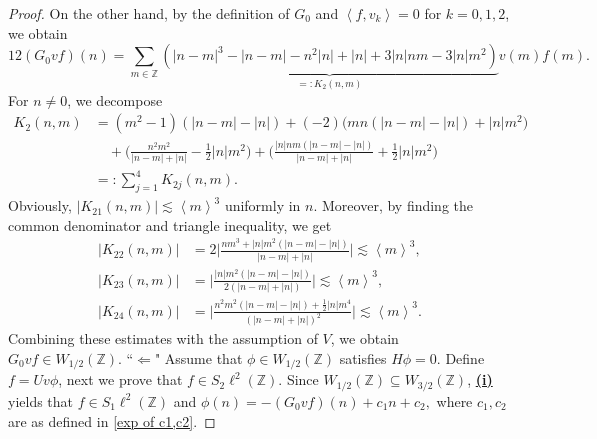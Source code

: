 \documentclass[reqno, 11pt]{amsart}
\newcommand\Z{\mathbb{Z}}
\numberwithin{equation}{section}
\begin{document}
\begin{proof}
On the other hand, by the definition of $G_0$ and $\left<f,v_k\right>=0$ for $k=0,1,2$, we obtain
\begin{equation*}
 12(G_0vf)(n)=\sum\limits_{m\in\Z}^{}\underbrace{\left(|n-m|^3-|n-m|-n^2|n|+|n|+3|n|nm-3|n|m^2\right)}_{=:K_2(n,m)}v(m)f(m).
 \end{equation*}
For $n\neq0$, we decompose 
 \begin{align*}
 K_2(n,m)&=(m^2-1)(|n-m|-|n|)+(-2)\big(mn(|n-m|-|n|)+|n|m^2\big)\\
 &\quad+\Big(\frac{n^2m^2}{|n-m|+|n|}-\frac{1}{2}|n|m^2\Big)+\Big(\frac{|n|nm(|n-m|-|n|)}{|n-m|+|n|}+\frac{1}{2}|n|m^2\Big)\\
&=:\sum\limits_{j=1}^{4}K_{2j}(n,m).
 \end{align*}
 Obviously, $|K_{21}(n,m)|\lesssim {\left<m\right>}^3$ uniformly in $n$. Moreover, by finding the common denominator and triangle inequality, we get
  \begin{align*}
  |K_{22}(n,m)|&=2\Big|\frac{nm^3+|n|m^2(|n-m|-|n|)}{|n-m|+|n|}\Big|\lesssim {\left<m\right>}^3 ,\\
  |K_{23}(n,m)|&=\Big|\frac{|n|m^2(|n-m|-|n|)}{2(|n-m|+|n|)}\Big|\lesssim{\left<m\right>}^3,\\
  |K_{24}(n,m)|&=\Big|\frac{n^2m^2(|n-m|-|n|)+\frac{1}{2}|n|m^4}{{(|n-m|+|n|)}^2}\Big|\lesssim{\left<m\right>}^3.
  \end{align*}
Combining these estimates with the assumption of $V$, we obtain $G_0vf\in W_{1/2}(\Z)$.
\vskip0.1cm
``$\bm{\Longleftarrow}$" Assume that $\phi\in W_{1/2}(\Z)$ satisfies $H\phi=0$. Define $f=Uv\phi$, next we prove that $f\in S_2\ell^2(\Z)$. Since $W_{1/2}(\Z)\subseteq W_{3/2}(\Z)$, {\bf{\underline{(i)}}} yields that $f\in S_1\ell^2(\Z)$ and
$\phi(n)=-(G_0vf)(n)+c_1n+c_2,$
where $c_1,c_2$ are as defined in \eqref{exp of c1,c2}.


\end{proof}
\end{document}
